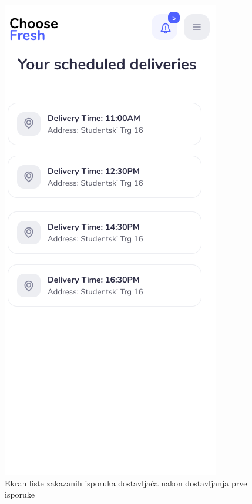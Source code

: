 \begin{figure}[H]
	\begin{center}
		\includegraphics[scale=0.3]{UI/deliveryman_list_of_packages_new.png}
    		   \caption{Ekran liste zakazanih isporuka dostavljača nakon dostavljanja prve isporuke}
    \label{fig:DeliverymanListNew}
    \end{center}
\end{figure}